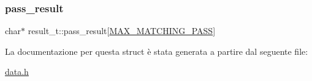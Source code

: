 \subsubsection{\texorpdfstring{pass\+\_\+result}{pass\_result}}
{\footnotesize\ttfamily char$\ast$ result\+\_\+t\+::pass\+\_\+result\mbox{[}\hyperlink{data_8h_a88f5ea90744f4c455d0337349a79d723}{M\+A\+X\+\_\+\+M\+A\+T\+C\+H\+I\+N\+G\+\_\+\+P\+A\+SS}\mbox{]}}



La documentazione per questa struct è stata generata a partire dal seguente file\+:\begin{DoxyCompactItemize}
\item 
\hyperlink{data_8h}{data.\+h}\end{DoxyCompactItemize}
